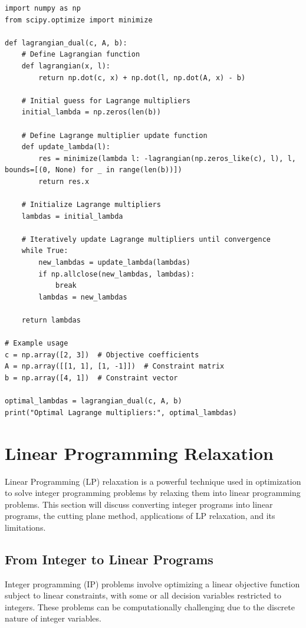 \documentclass[12pt]{book} %
\begin{document}
\begin{lstlisting}
import numpy as np
from scipy.optimize import minimize

def lagrangian_dual(c, A, b):
    # Define Lagrangian function
    def lagrangian(x, l):
        return np.dot(c, x) + np.dot(l, np.dot(A, x) - b)
    
    # Initial guess for Lagrange multipliers
    initial_lambda = np.zeros(len(b))
    
    # Define Lagrange multiplier update function
    def update_lambda(l):
        res = minimize(lambda l: -lagrangian(np.zeros_like(c), l), l, bounds=[(0, None) for _ in range(len(b))])
        return res.x
    
    # Initialize Lagrange multipliers
    lambdas = initial_lambda
    
    # Iteratively update Lagrange multipliers until convergence
    while True:
        new_lambdas = update_lambda(lambdas)
        if np.allclose(new_lambdas, lambdas):
            break
        lambdas = new_lambdas
    
    return lambdas

# Example usage
c = np.array([2, 3])  # Objective coefficients
A = np.array([[1, 1], [1, -1]])  # Constraint matrix
b = np.array([4, 1])  # Constraint vector

optimal_lambdas = lagrangian_dual(c, A, b)
print("Optimal Lagrange multipliers:", optimal_lambdas)
\end{lstlisting}

\section{Linear Programming Relaxation}

Linear Programming (LP) relaxation is a powerful technique used in optimization to solve integer programming problems by relaxing them into linear programming problems. This section will discuss converting integer programs into linear programs, the cutting plane method, applications of LP relaxation, and its limitations.

\subsection{From Integer to Linear Programs}

Integer programming (IP) problems involve optimizing a linear objective function subject to linear constraints, with some or all decision variables restricted to integers. These problems can be computationally challenging due to the discrete nature of integer variables.
\end{document}
